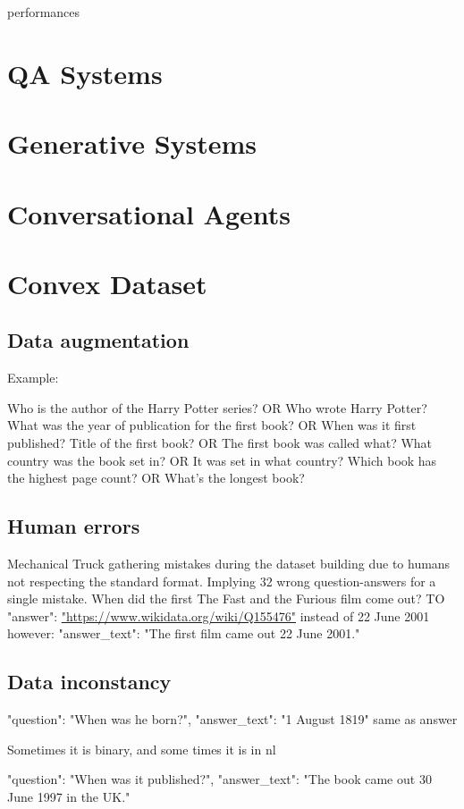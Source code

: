 performances

\section{QA Systems}
\section{Generative Systems}
\section{Conversational Agents}

\section{Convex Dataset}
\subsection{Data augmentation}
Example:

Who is the author of the Harry Potter series? OR Who wrote Harry Potter?
What was the year of publication for the first book? OR When was it first published?
Title of the first book? OR The first book was called what?
What country was the book set in? OR It was set in what country?
Which book has the highest page count? OR What's the longest book?


\subsection{Human errors}
Mechanical Truck gathering mistakes during the dataset building due to humans not respecting the standard format. Implying 32 wrong question-answers for a single mistake.
When did the first The Fast and the Furious film come out?
TO "answer": \url{"https://www.wikidata.org/wiki/Q155476"} instead of 22 June 2001
however: "answer\_text": "The first film came out 22 June 2001."

\subsection{Data inconstancy}
"question": "When was he born?",
"answer\_text": "1 August 1819" same as answer

Sometimes it is binary, and some times it is in \gls{nl}

"question": "When was it published?", 
"answer\_text": "The book came out 30 June 1997 in the UK."

